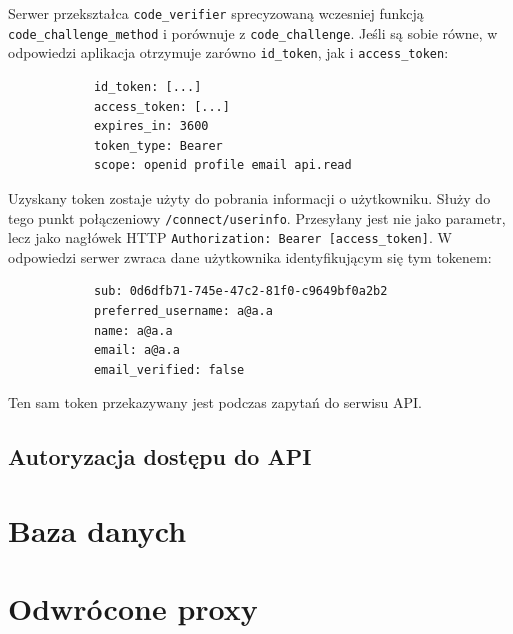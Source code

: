 		Serwer przekształca \verb|code_verifier| sprecyzowaną wczesniej funkcją \verb|code_challenge_method| i porównuje z \verb|code_challenge|.
		Jeśli są sobie równe, w odpowiedzi aplikacja otrzymuje zarówno \verb|id_token|, jak i \verb|access_token|:
		\begin{lstlisting}
			id_token: [...]
			access_token: [...]
			expires_in: 3600
			token_type: Bearer
			scope: openid profile email api.read
		\end{lstlisting}
		Uzyskany token zostaje użyty do pobrania informacji o użytkowniku.
		Służy do tego punkt połączeniowy \verb|/connect/userinfo|.
		Przesyłany jest nie jako parametr, lecz jako nagłówek HTTP \verb|Authorization: Bearer [access_token]|.
		W odpowiedzi serwer zwraca dane użytkownika identyfikującym się tym tokenem:
		\begin{lstlisting}
			sub: 0d6dfb71-745e-47c2-81f0-c9649bf0a2b2
			preferred_username: a@a.a
			name: a@a.a
			email: a@a.a
			email_verified: false
		\end{lstlisting}
		Ten sam token przekazywany jest podczas zapytań do serwisu API.

	\subsection{Autoryzacja dostępu do API}

\section{Baza danych}

\section{Odwrócone proxy}